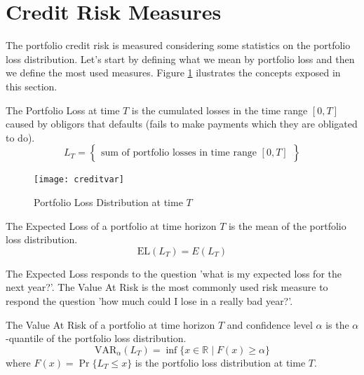 \documentclass[11pt,fleqn]{book} %
\begin{document}
\section{Credit Risk Measures}

The portfolio credit risk is measured considering some statistics on 
the portfolio loss distribution. Let's start by defining what we mean 
by portfolio loss and then we define the most used measures. Figure 
\ref{fig:lossdistr} ilustrates the concepts exposed in this section.

\begin{definition}
	The Portfolio Loss at time $T$ is the cumulated losses in the time 
	range $[0,T]$ caused by obligors that defaults (fails to make 
	payments which they are obligated to do).
	\begin{displaymath}
		L_T = \left\{
		\begin{array}{c}
			\text{sum of portfolio losses in time range $[0,T]$}
		\end{array}
		\right\}
	\end{displaymath}
\end{definition}

\begin{figure}[ht]
	\centering
	\texttt{[image: creditvar]}
	\caption{Portfolio Loss Distribution at time $T$}
	\label{fig:lossdistr}
\end{figure}

\begin{definition}
	The Expected Loss of a portfolio at time horizon $T$ is the 
	mean of the portfolio loss distribution.
	\begin{displaymath}
		\text{EL}(L_T) = E(L_T)
	\end{displaymath}
\end{definition}

The Expected Loss responds to the question 'what is my expected loss for 
the next year?'. The Value At Risk \cite{var:jorion} is the most commonly 
used risk measure to respond the question 'how much could I lose in a really 
bad year?'.

\begin{definition}
	The Value At Risk of a portfolio at time horizon $T$ and 
	confidence level $\alpha$ is the $\alpha$-quantile of the portfolio loss 
	distribution.
	\begin{displaymath}
		\text{VAR}_\alpha(L_T) = \inf\{x \in \mathbb{R} \mid F(x) \ge \alpha \}
	\end{displaymath}
	where $F(x)=\Pr\{L_T \le x\}$ is the portfolio loss distribution at time $T$.
\end{definition}
\end{document}
